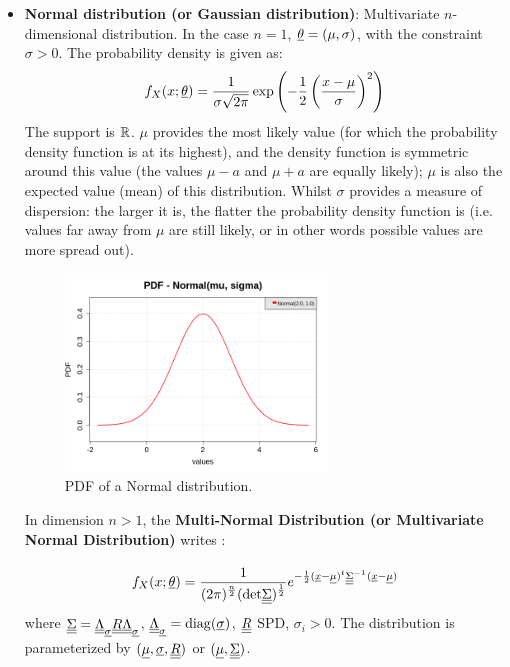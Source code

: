 {\begin{itemize}
\item {\bf Normal distribution (or Gaussian distribution)}: Multivariate $n$-dimensional distribution. In the case $n=1$, ${\underline{\theta}} = \left(\mu,\sigma \right)$, with the constraint  $\sigma>0$. The probability density is given as:
\begin{equation}
f_X(x;{\underline{\theta}}) = \frac{1}{\sigma \sqrt{2\pi}} \exp \left( -\frac{1}{2} \left( \frac{x-\mu}{\sigma} \right)^2 \right)
\end{equation}
The support is ${\mathbb R}$. $\mu$ provides the most likely value (for
which the probability density function is at its highest), and the
density function is symmetric around this value (the values
$\mu-a$ and $\mu+a$ are equally likely); $\mu$ is also the
expected value (mean) of this distribution. Whilst $\sigma$
provides a measure of dispersion: the larger it is, the flatter the probability density function is (i.e. values far away from $\mu$ are still likely, or in other words possible values are more spread out).

\begin{figure}[H]
\begin{center}
\includegraphics[width=7cm]{Figures/pdf_Normal.png}
\caption{PDF of a Normal distribution.}
\end{center}
\end{figure}

In dimension $n>1$, the {\bf Multi-Normal Distribution (or Multivariate Normal Distribution)} writes :
\begin{equation}
f_X(x;{\underline{\theta}}) = \displaystyle
\frac{1}
{
\displaystyle (2\pi)^{\frac{n}{2}}(\mathrm{det}{\underline{\underline{\Sigma}}})^{\frac{1}{2}}
}
\displaystyle e^{-\frac{1}{2}{{({\underline{x}}-{\underline{\mu}})}^t}{\underline{\underline{\Sigma}}}^{-1^{\strut}}({\underline{x}}-{\underline{\mu}})}
\end{equation}
where  ${\underline{\underline{\Sigma}}} = {\underline{\underline{\Lambda}}}_{{\underline{\sigma}}} {\underline{\underline{R}}} {\underline{\underline{\Lambda}}}_{{\underline{\sigma}}}$, ${\underline{\underline{\Lambda}}}_{{\underline{\sigma}}} = \mathrm{diag}({\underline{\sigma}})$, ${\underline{\underline{R}}}$ SPD, $\sigma_i >0$. The distribution is parameterized by  $({\underline{\mu}}, {\underline{\sigma}},{\underline{\underline{R}}})$ or $({\underline{\mu}}, {\underline{\underline{\Sigma}}})$.






\end{itemize}}
